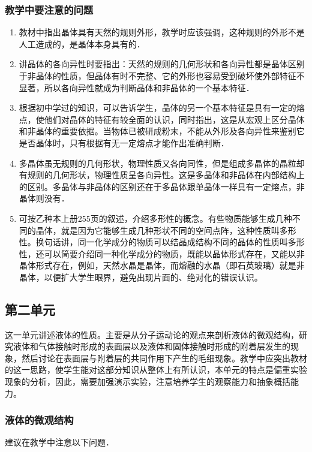 \subsubsection{教学中要注意的问题}
\begin{enumerate}
\item 教材中指出晶体具有天然的规则外形，教学时应该强调，这种规则的外形不是人工造成的，是晶体本身具有的．
\item 讲晶体的各向异性时要指出：天然的规则的几何形状和各向异性都是晶体区别于非晶体的性质，但晶体有时不完整、它的外形也容易受到破坏使外部特征不显著，所以各向异性就成为判断晶体和非晶体的一个基本特征．
\item 根据初中学过的知识，可以告诉学生，晶体的另一个基本特征是具有一定的熔点，使他们对晶体的特征有较全面的认识，同时指出，这是从宏观上区分晶体和非晶体的重要依据。当物体已被研成粉末，不能从外形及各向异性来鉴别它是否晶体时，只有根据有无一定熔点才能作出准确判断．
\item 多晶体虽无规则的几何形状，物理性质又各向同性，但是组成多晶体的晶粒却有规则的几何形状，物理性质呈各向异性。这是多晶体和非晶体在内部结构上的区别。多晶体与非晶体的区别还在于多晶体跟单晶体一样具有一定熔点，非晶体则没有．
\item 可按乙种本上册255页的叙述，介绍多形性的概念。有些物质能够生成几种不同的晶体，就是因为它能够生成几种形状不同的空间点阵，这种性质叫多形性。换句话讲，同一化学成分的物质可以结晶成结构不同的晶体的性质叫多形性，还可以简要介绍同一种化学成分的物质，既能以晶体形式存在，又能以非晶体形式存在，例如，天然水晶是晶体，而熔融的水晶（即石英玻璃）就是非晶体，以便扩大学生眼界，避免出现片面的、绝对化的错误认识。
\end{enumerate}



\subsection{第二单元}
这一单元讲述液体的性质。主要是从分子运动论的观点来剖析液体的微观结构，研究液体和气体接触时形成的表面层以及液体和固体接触时形成的附着层发生的现象，然后讨论在表面层与附着层的共同作用下产生的毛细现象。教学中应突出教材的这一思路，使学生能对这部分知识从整体上有所认识，本单元的特点是偏重实验现象的分析，因此，需要加强演示实验，注意培养学生的观察能力和抽象概括能力。

\subsubsection{液体的微观结构}

建议在教学中注意以下问题．

